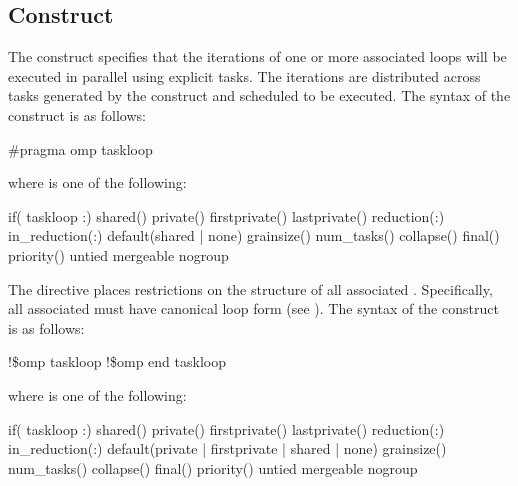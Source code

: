 \subsection{ Construct}
\label{subsec:taskloop Construct}
\summary
The  construct specifies that the iterations of one or more associated loops will be executed in parallel using explicit tasks. The iterations are distributed across tasks generated by the construct and scheduled to be executed.
\syntax
\ccppspecificstart
The syntax of the  construct is as follows:
\begin{boxedcode}
\#pragma omp taskloop 
\end{boxedcode}
where  is one of the following:
\begin{indentedcodelist}
if(\plc{[} taskloop :\plc{] scalar-expr})
shared()
private()
firstprivate()
lastprivate()
reduction(:)
in_reduction(:)
default(shared \textnormal{|} none)
grainsize()
num_tasks()
collapse()
final()
priority()
untied
mergeable
nogroup
\end{indentedcodelist}

The  directive places restrictions on the structure of all associated . Specifically, all associated  must have canonical loop form (see ).
\ccppspecificend
\fortranspecificstart
The syntax of the  construct is as follows:
\begin{boxedcode}
!\$omp taskloop 
\plc{[}!\$omp end taskloop\plc{]}
\end{boxedcode}
where  is one of the following:
\begin{indentedcodelist}
if(\plc{[} taskloop :\plc{] scalar-logical-expr})
shared()
private()
firstprivate()
lastprivate()
reduction(:)
in_reduction(:)
default(private \textnormal{|} firstprivate \textnormal{|} shared \textnormal{|} none)
grainsize()
num_tasks()
collapse()
final()
priority()
untied
mergeable
nogroup
\end{indentedcodelist}

